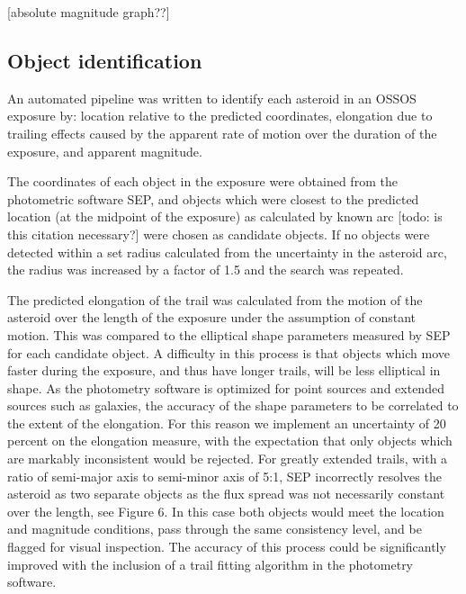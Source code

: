 \documentclass[iop,apj]{emulateapj}
\begin{document}
[absolute magnitude graph??]

\subsection{Object identification}

An automated pipeline was written to identify each asteroid in an OSSOS exposure by: location relative to the predicted coordinates,  elongation due to trailing effects caused by the apparent rate of motion over the duration of the exposure, and apparent magnitude. 

The coordinates of each object in the exposure were obtained from the photometric software SEP, and objects which were closest to the predicted location (at the midpoint of the exposure) as calculated by known arc \citep{jpl} [todo: is this citation necessary?] were chosen as candidate objects. If no objects were detected within a set radius calculated from the uncertainty in the asteroid arc, the radius was increased by a factor of 1.5 and the search was repeated.

The predicted elongation of the trail was calculated from the motion of the asteroid over the length of the exposure \citep{jpl} under the assumption of constant motion. This was compared to the elliptical shape parameters measured by SEP for each candidate object. 
A difficulty in this process is that objects which move faster during the exposure, and thus have longer trails, will be less elliptical in shape. As the photometry software is optimized for point sources and extended sources such as galaxies, the accuracy of the shape parameters to be correlated to the extent of the elongation. For this reason we implement an uncertainty of 20 percent on the elongation measure, with the expectation that only objects which are markably inconsistent would be rejected. For greatly extended trails, with a ratio of semi-major axis to semi-minor axis of 5:1, SEP incorrectly resolves the asteroid as two separate objects as the flux spread was not necessarily constant over the length, see Figure 6. In this case both objects would meet the location and magnitude conditions, pass through the same consistency level, and be flagged for visual inspection. The accuracy of this process could be significantly improved with the inclusion of a trail fitting algorithm in the photometry software.
\end{document}

